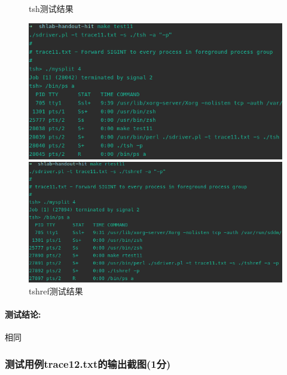 \begin{figure}[H]
    \begin{minipage}[c]{0.5\linewidth}
        \centering
        \caption{tsh测试结果}
        \includegraphics[width=0.99\linewidth]{figures/test11.png}
    \end{minipage}
    \begin{minipage}[c]{0.5\linewidth}
        \centering
        \caption{tshref测试结果}
        \includegraphics[width=0.99\linewidth]{figures/rtest11.png}
    \end{minipage}
\end{figure}

\paragraph{测试结论:}相同

\subsubsection{测试用例trace12.txt的输出截图(1分)}

